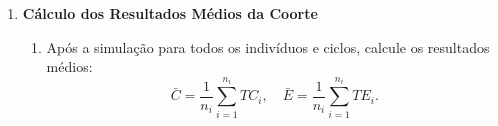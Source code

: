\documentclass[12pt]{article}
\theoremstyle{break}
\begin{document}
\begin{enumerate}
\begin{enumerate}[label=\alph*)]
\begin{enumerate}[label=\roman*)]
\begin{enumerate}[label=\alph*)]
                \begin{itemize}
                    \item Determine o custo imediato $c_{it}$ e o benéficio $QALY_{it}$, considerando o estado $M_{it}$, o tratamento $Trt_i$ e a heterogeneidade $\gamma_i$.
                    \item Aplique os fatores de desconto:
                    \[
                    c_{it}^{\text{desc}} = c_{it} \times \frac{1}{(1 + d_c)^t}, \quad QALY_{it}^{\text{desc}} = QALY_{it}\times \frac{1}{(1 + d_e)^t}.
                    \]
                \end{itemize}
                \item \textbf{Atualização dos Acumulados}:
                \begin{itemize}
                    \item Atualize os valores acumulados até o ciclo $n$:
                    \[
                    TC_i = \sum_{t = 0}^nc_i^{\text{desc}} , \quad TE_i =   \sum_{t = 0}^nQALY_{it}^{\text{desc}}.
                    \]
                \end{itemize}
                \item \textbf{Atualização da Duração}:
                \begin{itemize}
                    \item Atualize a duração nos estados doentes:
                    \[
                    dur_i(t) =
                    \begin{cases}
                        dur_i(t-1) + 1, & \text{se } M_{it} \in \{S1, S2\} \\
                        0,              & \text{caso contrário}.
                    \end{cases}
                    \]
                \end{itemize}
            \end{enumerate}
        \end{enumerate}
    \end{enumerate}
    
    \item \textbf{Cálculo dos Resultados Médios da Coorte}
    \begin{enumerate}[label=\alph*)]
        \item Após a simulação para todos os indivíduos e ciclos, calcule os resultados médios:
        \[
        \bar{C} = \frac{1}{n_i} \sum_{i=1}^{n_i} TC_i, \quad \bar{E} = \frac{1}{n_i} \sum_{i=1}^{n_i} TE_i.
        \]
    \end{enumerate}
\end{enumerate}
\end{document}
